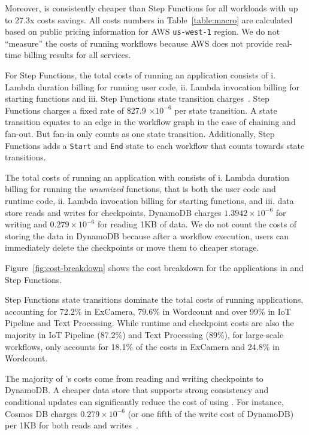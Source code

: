 Moreover, \name{} is consistently cheaper than Step Functions for all
workloads with up to 27.3x costs savings. All costs numbers in
Table~\ref{table:macro} are calculated based on public pricing information for
AWS \texttt{us-west-1} region. We do not ``measure'' the costs of running
workflows because AWS does not provide real-time billing results for all
services.

For Step Functions, the total costs of running an application consists of i.
Lambda duration billing for running user code, ii. Lambda invocation billing
for starting functions and iii. Step Functions state transition
charges~\cite{aws-step-functions-pricing}. Step Functions charges a fixed rate
of \$27.9 $ \times 10^{-6}$ per state transition. A state transition equates
to an edge in the workflow graph in the case of chaining and fan-out. But
fan-in only counts as one state transition. Additionally, Step Functions adds
a \texttt{Start} and \texttt{End} state to each workflow that counts towards
state transitions.

The total costs of running an application with \name{} consists of i. Lambda
duration billing for running the \emph{unumized} functions, that is both the
user code and \name{} runtime code, ii. Lambda invocation billing for starting
functions, and iii. data store reads and writes for checkpoints. DynamoDB
charges $1.3942 \times 10^{-6}$ for writing and $0.279
\times 10^{-6}$ for reading 1KB of data. We do not count the costs of storing
the data in DynamoDB because after a workflow execution, users can immediately
delete the checkpoints or move them to cheaper storage.

Figure~\ref{fig:cost-breakdown} shows the cost breakdown for the applications
in \name{} and Step Functions.


Step Functions state transitions dominate the total costs of running
applications, accounting for 72.2\% in ExCamera, 79.6\% in Wordcount and over
99\% in IoT Pipeline and Text Processing. While \name{} runtime and checkpoint
costs are also the majority in IoT Pipeline (87.2\%) and Text Processing
(89\%), for large-scale workflows, \name{} only accounts for 18.1\% of the
costs in ExCamera and 24.8\% in Wordcount.

The majority of \name{}'s costs come from reading and writing checkpoints to
DynamoDB. A cheaper data store that supports strong consistency and
conditional updates can significantly reduce the cost of using \name{}. For
instance, Cosmos DB charges $0.279 \times 10^{-6}$ (or one fifth of the write
cost of DynamoDB) per 1KB for both reads and writes~\cite{cosmosdb-pricing}.

